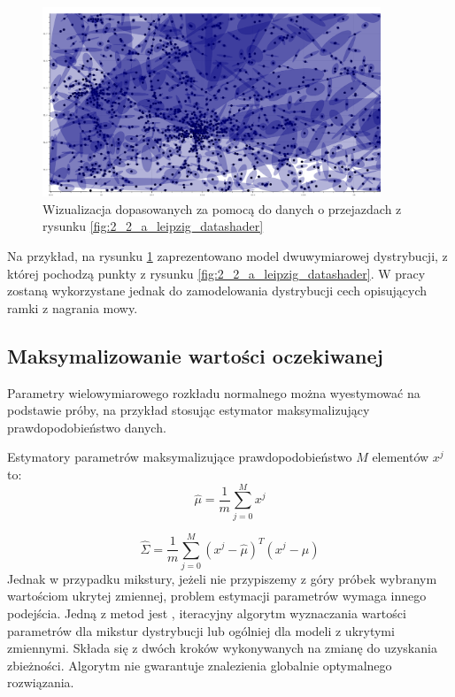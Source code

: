 \begin{figure}[H]
    \centering
    \includegraphics[width=0.9\textwidth]{images/2_2_a_leipzig_gmm}
    \caption{Wizualizacja  dopasowanych za pomocą  do danych o przejazdach z rysunku \ref{fig:2_2_a_leipzig_datashader}}
    \label{fig:2_2_a_leipzig_gmm}
\end{figure}

Na przykład, na rysunku \ref{fig:2_2_a_leipzig_gmm} zaprezentowano model  dwuwymiarowej dystrybucji,
z której pochodzą punkty z rysunku \ref{fig:2_2_a_leipzig_datashader}. W pracy  zostaną wykorzystane
jednak do zamodelowania dystrybucji cech opisujących ramki z nagrania mowy.

\subsection{Maksymalizowanie wartości oczekiwanej}\label{sec:expectation_maximization}

Parametry wielowymiarowego rozkładu normalnego można wyestymować na podstawie próby, na przykład
stosując estymator maksymalizujący prawdopodobieństwo danych.

Estymatory parametrów maksymalizujące prawdopodobieństwo $M$ elementów $x^j$ to:
$$\hat{\mu} = \frac{1}{m} \sum_{j=0}^M x^{j}$$

$$\hat{\Sigma} = \frac{1}{m} \sum_{j=0}^M (x^{j} - \hat{\mu})^T (x^{j} - \hat{\mu})$$
Jednak w przypadku mikstury, jeżeli nie przypiszemy z góry próbek wybranym wartościom ukrytej zmiennej, problem
estymacji parametrów wymaga innego podejścia. Jedną z metod jest , iteracyjny
algorytm wyznaczania wartości parametrów dla mikstur dystrybucji lub ogólniej dla modeli z ukrytymi zmiennymi.
Składa się z dwóch kroków wykonywanych na zmianę do uzyskania zbieżności.  Algorytm nie gwarantuje znalezienia
globalnie optymalnego rozwiązania.

